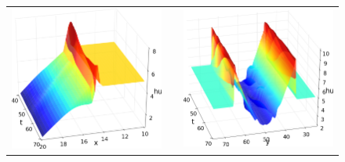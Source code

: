 \documentclass[preprint, 11pt]{article}
\begin{document}
\begin{figure}[!h]
{\begin{tabular}{ccc}
      \\
      \includegraphics[scale=0.25,valign=t]{figures/slices_of_hu_blended_at_y50.png}
      & &
      \includegraphics[scale=0.25,valign=t]{figures/slices_of_hu_blended_at_x18.png}
    \end{tabular}
  }
  \quad
  \subfloat[Location of the shock along $y=50$. \label{fig:pos_of_shock}]{
}
\end{figure}
\end{document}
